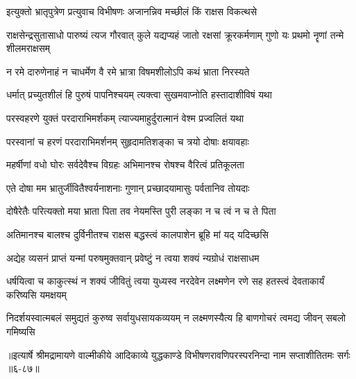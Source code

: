 \twolineshloka
{इत्युक्तो भ्रातृपुत्रेण प्रत्युवाच विभीषणः}
{अजानन्निव मच्छीलं किं राक्षस विकत्थसे} %

\threelineshloka
{राक्षसेन्द्रसुतासाधो पारुष्यं त्यज गौरवात्}
{कुले यद्यप्यहं जातो रक्षसां क्रूरकर्मणाम्}
{गुणो यः प्रथमो नॄणां तन्मे शीलमराक्षसम्} %

\twolineshloka
{न रमे दारुणेनाहं न चाधर्मेण वै रमे}
{भ्रात्रा विषमशीलोऽपि कथं भ्राता निरस्यते} %

\twolineshloka
{धर्मात् प्रच्युतशीलं हि पुरुषं पापनिश्चयम्}
{त्यक्त्वा सुखमवाप्नोति हस्तादाशीविषं यथा} %

\twolineshloka
{परस्वहरणे युक्तं परदाराभिमर्शकम्}
{त्याज्यमाहुर्दुरात्मानं वेश्म प्रज्वलितं यथा} %

\twolineshloka
{परस्वानां च हरणं परदाराभिमर्शनम्}
{सुहृदामतिशङ्का च त्रयो दोषाः क्षयावहाः} %

\twolineshloka
{महर्षीणां वधो घोरः सर्वदेवैश्च विग्रहः}
{अभिमानश्च रोषश्च वैरित्वं प्रतिकूलता} %

\twolineshloka
{एते दोषा मम भ्रातुर्जीवितैश्वर्यनाशनाः}
{गुणान् प्रच्छादयामासुः पर्वतानिव तोयदाः} %

\twolineshloka
{दोषैरेतैः परित्यक्तो मया भ्राता पिता तव}
{नेयमस्ति पुरी लङ्का न च त्वं न च ते पिता} %

\twolineshloka
{अतिमानश्च बालश्च दुर्विनीतश्च राक्षस}
{बद्धस्त्वं कालपाशेन ब्रूहि मां यद् यदिच्छसि} %

\twolineshloka
{अद्येह व्यसनं प्राप्तं यन्मां परुषमुक्तवान्}
{प्रवेष्टुं न त्वया शक्यं न्यग्रोधं राक्षसाधम} %

\threelineshloka
{धर्षयित्वा च काकुत्स्थं न शक्यं जीवितुं त्वया}
{युध्यस्व नरदेवेन लक्ष्मणेन रणे सह}
{हतस्त्वं देवताकार्यं करिष्यसि यमक्षयम्} %

\twolineshloka
{निदर्शयस्वात्मबलं समुद्यतं कुरुष्व सर्वायुधसायकव्ययम्}
{न लक्ष्मणस्यैत्य हि बाणगोचरं त्वमद्य जीवन् सबलो गमिष्यसि} %


॥इत्यार्षे श्रीमद्रामायणे वाल्मीकीये आदिकाव्ये युद्धकाण्डे विभीषणरावणिपरस्परनिन्दा नाम सप्ताशीतितमः सर्गः ॥६-८७॥
